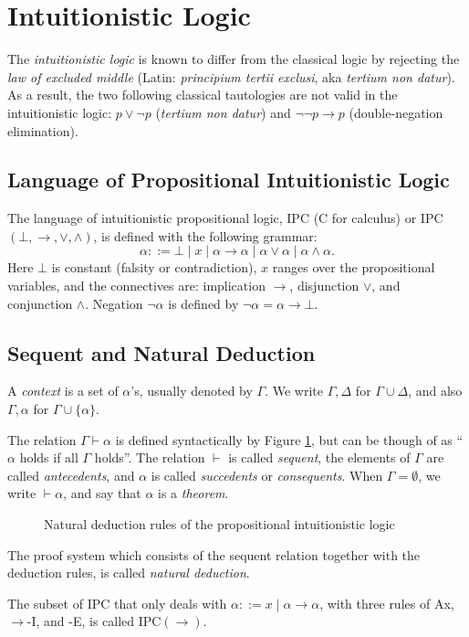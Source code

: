 \section{Intuitionistic Logic}

The \textit{intuitionistic logic} is known to differ from the classical logic by rejecting the \textit{law of excluded middle} (Latin: \textit{principium tertii exclusi}, aka \textit{tertium non datur}). As a result, the two following classical tautologies are not valid in the intuitionistic logic: $p \vee \neg p$ (\textit{tertium non datur}) and $\neg \neg p \rightarrow p$ (double-negation elimination).

\subsection{Language of Propositional Intuitionistic Logic}

The language of intuitionistic propositional logic, IPC (C for calculus) or IPC$(\bot, \rightarrow, \vee, \wedge)$, is defined with the following grammar:
\[
\alpha ::= \bot \mid x \mid \alpha \rightarrow \alpha \mid \alpha \vee \alpha \mid \alpha \wedge \alpha.
\]
Here $\bot$ is constant (falsity or contradiction), $x$ ranges over the propositional variables, and the connectives are: implication $\rightarrow$, disjunction $\vee$, and conjunction $\wedge$. Negation $\neg \alpha$ is defined by $\neg \alpha = \alpha \rightarrow \bot$.

\subsection{Sequent and Natural Deduction}

A \textit{context} is a set of $\alpha$'s, usually denoted by $\Gamma$. We write $\Gamma, \Delta$ for $\Gamma \cup \Delta$, and also $\Gamma, \alpha$ for $\Gamma \cup \{\alpha\}$. 

\begin{definition}[Sequent]
The relation $\Gamma \vdash \alpha$ is defined syntactically by Figure \ref{fig:intuitionistic-logic-natural-deduction}, but can be though of as ``$\alpha$ holds if all $\Gamma$ holds''. The relation $\vdash$ is called \textit{sequent}, the elements of $\Gamma$ are called \textit{antecedents}, and $\alpha$ is called \textit{succedents} or \textit{consequents}. When $\Gamma = \emptyset$, we write $\vdash \alpha$, and say that $\alpha$ is a \textit{theorem}.
\end{definition}

\begin{figure}
    \centering
    
    \caption{Natural deduction rules of the propositional intuitionistic logic}
    \label{fig:intuitionistic-logic-natural-deduction}
\end{figure}

The proof system which consists of the sequent relation together with the deduction rules, is called \textit{natural deduction}.

The subset of IPC that only deals with $\alpha ::= x \mid \alpha \rightarrow \alpha$, with three rules of Ax, $\rightarrow$-I, and -E, is called IPC$(\rightarrow)$.